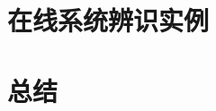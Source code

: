 \documentclass[10pt,a4paper,UTF8, twocolumn]{ctexart}
\begin{document}
	


\section{在线系统辨识实例}
	
	


\section{总结}
	

	
\end{document}
